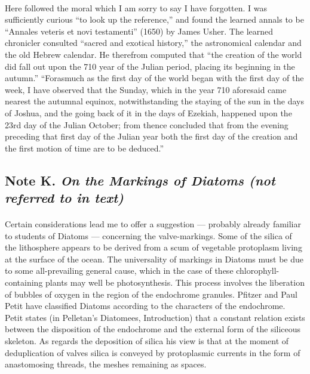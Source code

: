 \documentclass[a4paper, 12pt, oneside]{article}
\begin{document}
\paragraph{}
Here followed the moral which I am sorry to say I have forgotten. I was sufficiently curious ``to look up the reference,'' and found the learned annals to be ``Annales veteris et novi testamenti'' (1650) by James Usher. The learned chronicler consulted ``sacred and exotical history,'' the astronomical calendar and the old Hebrew calendar. He therefrom computed that ``the creation of the world did fall out upon the 710 year of the Julian period, placing its beginning in the autumn.'' ``Forasmuch as the first day of the world began with the first day of the week, I have observed that the Sunday, which in the year 710 aforesaid came nearest the autumnal equinox, notwithstanding the staying of the sun in the days of Joshua, and the going back of it in the days of Ezekiah, happened upon the 23rd day of the Julian October; from thence concluded that from the evening preceding that first day of the Julian year both the first day of the creation and the first motion of time are to be deduced.''

\subsection{Note K. \emph{On the Markings of Diatoms (not referred to in text)}}
\paragraph{}
Certain considerations lead me to offer a suggestion --- probably already familiar to students of Diatoms --- concerning the valve-markings. Some of the silica of the lithosphere appears to be derived from a scum of vegetable protoplasm living at the surface of the ocean. The universality of markings in Diatoms must be due to some all-prevailing general cause, which in the case of these chlorophyll-containing plants may well be photosynthesis. This process involves the liberation of bubbles of oxygen in the region of the endochrome granules. Pfitzer and Paul Petit have classified Diatoms according to the characters of the endochrome. Petit states (in Pelletan's Diatomees, Introduction) that a constant relation exists between the disposition of the endochrome and the external form of the siliceous skeleton. As regards the deposition of silica his view is that at the moment of deduplication of valves silica is conveyed by protoplasmic currents in the form of anastomosing threads, the meshes remaining as spaces.
\end{document}
